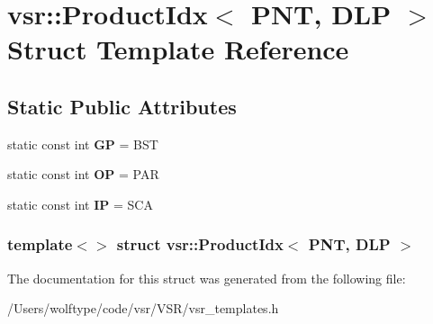 \hypertarget{structvsr_1_1_product_idx_3_01_p_n_t_00_01_d_l_p_01_4}{\section{vsr\-:\-:Product\-Idx$<$ P\-N\-T, D\-L\-P $>$ Struct Template Reference}
\label{structvsr_1_1_product_idx_3_01_p_n_t_00_01_d_l_p_01_4}
}
\subsection*{Static Public Attributes}
\begin{DoxyCompactItemize}
\item 
\hypertarget{structvsr_1_1_product_idx_3_01_p_n_t_00_01_d_l_p_01_4_a30bc01688456c0b7a2895e95f0759d58}{static const int {\bfseries G\-P} = B\-S\-T}\label{structvsr_1_1_product_idx_3_01_p_n_t_00_01_d_l_p_01_4_a30bc01688456c0b7a2895e95f0759d58}

\item 
\hypertarget{structvsr_1_1_product_idx_3_01_p_n_t_00_01_d_l_p_01_4_a76fc0e2e488d4c5b5a17f0fd0d6e0a8b}{static const int {\bfseries O\-P} = P\-A\-R}\label{structvsr_1_1_product_idx_3_01_p_n_t_00_01_d_l_p_01_4_a76fc0e2e488d4c5b5a17f0fd0d6e0a8b}

\item 
\hypertarget{structvsr_1_1_product_idx_3_01_p_n_t_00_01_d_l_p_01_4_a5f8308b71708ad061d56a5aa779a2db3}{static const int {\bfseries I\-P} = S\-C\-A}\label{structvsr_1_1_product_idx_3_01_p_n_t_00_01_d_l_p_01_4_a5f8308b71708ad061d56a5aa779a2db3}

\end{DoxyCompactItemize}
\subsubsection*{template$<$$>$ struct vsr\-::\-Product\-Idx$<$ P\-N\-T, D\-L\-P $>$}



The documentation for this struct was generated from the following file\-:\begin{DoxyCompactItemize}
\item 
/\-Users/wolftype/code/vsr/\-V\-S\-R/vsr\-\_\-templates.\-h\end{DoxyCompactItemize}
